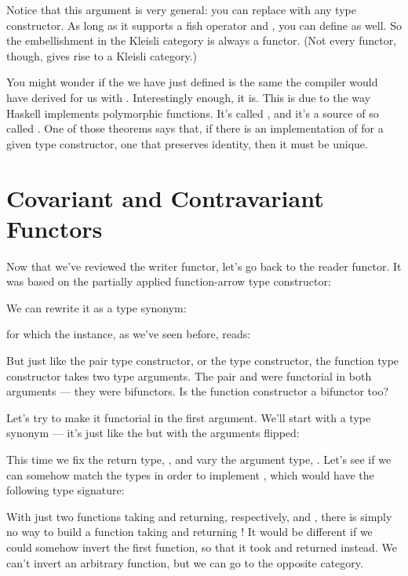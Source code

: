 Notice that this argument is very general: you can replace
 with any type constructor. As long as it supports a fish
operator and , you can define  as well. So
the embellishment in the Kleisli category is always a functor. (Not
every functor, though, gives rise to a Kleisli category.)

You might wonder if the  we have just defined is the same
 the compiler would have derived for us with
. Interestingly enough, it is. This is due to
the way Haskell implements polymorphic functions. It's called
, and it's a source of so called
. One of those theorems says that, if there is
an implementation of  for a given type constructor, one
that preserves identity, then it must be unique.

\section{Covariant and Contravariant Functors}

Now that we've reviewed the writer functor, let's go back to the reader
functor. It was based on the partially applied function-arrow type
constructor:

We can rewrite it as a type synonym:

for which the  instance, as we've seen before, reads:

But just like the pair type constructor, or the  type
constructor, the function type constructor takes two type arguments. The
pair and  were functorial in both arguments --- they were
bifunctors. Is the function constructor a bifunctor too?

Let's try to make it functorial in the first argument. We'll start with
a type synonym --- it's just like the  but with the
arguments flipped:

This time we fix the return type, , and vary the argument
type, . Let's see if we can somehow match the types in order
to implement , which would have the following type
signature:

With just two functions taking  and returning, respectively,
 and , there is simply no way to build a function
taking  and returning ! It would be different if we
could somehow invert the first function, so that it took  and
returned  instead. We can't invert an arbitrary function, but
we can go to the opposite category.

